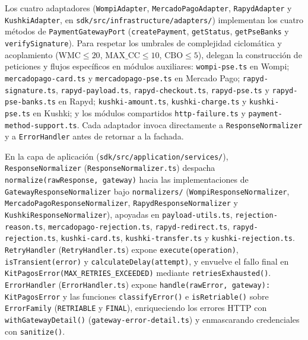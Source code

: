 Los cuatro adaptadores (\texttt{WompiAdapter}, \texttt{MercadoPagoAdapter}, \texttt{RapydAdapter} y \texttt{KushkiAdapter}, en \texttt{sdk/\allowbreak{}src/\allowbreak{}infrastructure/\allowbreak{}adapters/}) implementan los cuatro métodos de \texttt{PaymentGatewayPort} (\texttt{createPayment}, \texttt{getStatus}, \texttt{getPseBanks} y \texttt{verifySignature}). Para respetar los umbrales de complejidad ciclomática y acoplamiento ($\mathrm{WMC} \le 20$, $\mathrm{MAX\_CC} \le 10$, $\mathrm{CBO} \le 5$), delegan la construcción de peticiones y flujos específicos en módulos auxiliares: \texttt{wompi-\allowbreak{}pse.ts} en Wompi; \texttt{mercadopago-\allowbreak{}card.ts} y \texttt{mercadopago-\allowbreak{}pse.ts} en Mercado Pago; \texttt{rapyd-\allowbreak{}signature.ts}, \texttt{rapyd-\allowbreak{}payload.ts}, \texttt{rapyd-\allowbreak{}checkout.ts}, \texttt{rapyd-\allowbreak{}pse.ts} y \texttt{rapyd-\allowbreak{}pse-\allowbreak{}banks.ts} en Rapyd; \texttt{kushki-\allowbreak{}amount.ts}, \texttt{kushki-\allowbreak{}charge.ts} y \texttt{kushki-\allowbreak{}pse.ts} en Kushki; y los módulos compartidos \texttt{http-\allowbreak{}failure.ts} y \texttt{payment-\allowbreak{}method-\allowbreak{}support.ts}. Cada adaptador invoca directamente a \texttt{ResponseNormalizer} y a \texttt{ErrorHandler} antes de retornar a la fachada.

\begin{sloppypar}En la capa de aplicación (\texttt{sdk/\allowbreak{}src/\allowbreak{}application/\allowbreak{}services/}), \texttt{Response\allowbreak{}Normalizer} (\texttt{Response\allowbreak{}Normalizer.ts}) despacha \texttt{normalize(\allowbreak{}rawResponse, gateway)} hacia las implementaciones de \texttt{Gateway\allowbreak{}Response\allowbreak{}Normalizer} bajo \texttt{normalizers/} (\texttt{Wompi\allowbreak{}Response\allowbreak{}Normalizer}, \texttt{Mercado\allowbreak{}Pago\allowbreak{}Response\allowbreak{}Normalizer}, \texttt{Rapyd\allowbreak{}Response\allowbreak{}Normalizer} y \texttt{Kushki\allowbreak{}Response\allowbreak{}Normalizer}), apoyadas en \texttt{payload-\allowbreak{}utils.ts}, \texttt{rejection-\allowbreak{}reason.ts}, \texttt{mercadopago-\allowbreak{}rejection.ts}, \texttt{rapyd-\allowbreak{}redirect.ts}, \texttt{rapyd-\allowbreak{}rejection.ts}, \texttt{kushki-\allowbreak{}card.ts}, \texttt{kushki-\allowbreak{}transfer.ts} y \texttt{kushki-\allowbreak{}rejection.ts}. \texttt{RetryHandler} (\texttt{RetryHandler.ts}) expone \texttt{execute(\allowbreak{}operation)}, \texttt{isTransient(\allowbreak{}error)} y \texttt{calculateDelay(\allowbreak{}attempt)}, y envuelve el fallo final en \texttt{KitPagosError(\allowbreak{}MAX\_\allowbreak{}RETRIES\_\allowbreak{}EXCEEDED)} mediante \texttt{retries\allowbreak{}Exhausted()}. \texttt{ErrorHandler} (\texttt{ErrorHandler.ts}) expone \texttt{handle(\allowbreak{}rawError, gateway): KitPagosError} y las funciones \texttt{classifyError()} e \texttt{isRetriable()} sobre \texttt{ErrorFamily} (\texttt{RETRIABLE} y \texttt{FINAL}), enriqueciendo los errores HTTP con \texttt{with\allowbreak{}Gateway\allowbreak{}Detail()} (\texttt{gateway-\allowbreak{}error-\allowbreak{}detail.ts}) y enmascarando credenciales con \texttt{sanitize()}.\end{sloppypar}

